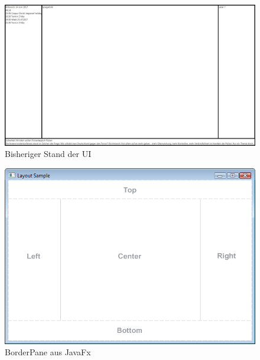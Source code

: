 \begin{figure}
	\centering
	\includegraphics[width=1\textwidth]{figures/magic_mirror_ui_milestone_3.jpg}
	\caption{Bisheriger Stand der UI}
	\label{img:mirror_ui}
\end{figure}

\begin{figure}
	\centering
	\includegraphics[width=1\textwidth]{figures/magic_mirror_JavaFx_borderpane.png}
	\caption{BorderPane aus JavaFx}
	\label{img:mirror_borderpane}
\end{figure}

